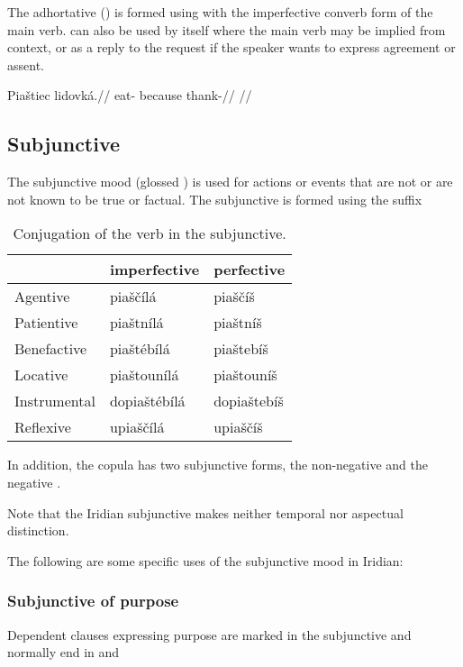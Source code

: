 The adhortative () is formed using  with the imperfective converb form of the main verb.  can also be used by itself where the main verb may be implied from context, or as a reply to the request if the speaker wants to express agreement or assent.

\pex
\begingl
\gla Piaštiec lidovká.//
\glb eat- because thank-//
\glft {}//
\endgl
\xe

\subsection{Subjunctive}

The subjunctive mood (glossed ) is used for actions or events that are not or are not known to be true or factual. The subjunctive is formed using the suffix 

\begin{table}
	\footnotesize\sffamily
	\caption{Conjugation of the verb  in the subjunctive.}
	\begin{tabu}to 0.7\textwidth{YYY}
		\toprule
		&{\sc imperfective} &{\sc perfective}\\
		\midrule
		Agentive	& piaščílá	& piaščíš\\
		Patientive	& piaštnílá		& piaštníš\\
		Benefactive	& piaštébílá		& piaštebíš\\
		Locative	& piaštounílá		& piaštouníš\\
		Instrumental& dopiaštébílá	& dopiaštebíš\\
		Reflexive	& upiaščílá	& upiaščíš\\
		\bottomrule
	\end{tabu}
\end{table}

In addition, the copula has two subjunctive forms, the non-negative  and the negative .

Note that the Iridian subjunctive makes neither temporal nor aspectual distinction.

\par The following are some specific uses of the subjunctive mood in Iridian:

\subsubsection{Subjunctive of purpose}

Dependent clauses expressing purpose are marked in the subjunctive and normally end in  and 

